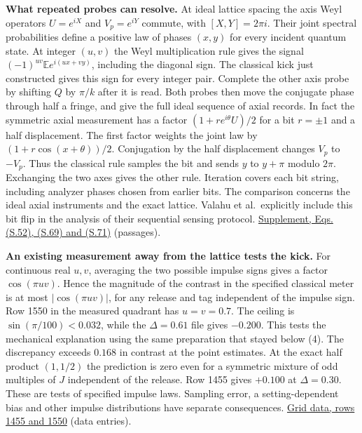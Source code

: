 \documentclass[11pt,a4paper]{article}
\begin{document}
\textbf{What repeated probes can resolve.} At ideal lattice spacing the
axis Weyl operators \(U=e^{iX}\) and \(V_p=e^{iY}\) commute, with
\([X,Y]=2\pi i\). Their joint spectral probabilities define a positive
law of phases \((x,y)\) for every incident quantum state. At integer
\((u,v)\) the Weyl multiplication rule gives the signal
\((-1)^{uv}\mathbb E e^{i(ux+vy)}\), including the diagonal sign. The
classical kick just constructed gives this sign for every integer pair.
Complete the other axis probe by shifting \(Q\) by \(\pi/k\) after it is
read. Both probes then move the conjugate phase through half a fringe,
and give the full ideal sequence of axial records. In fact the symmetric
axial measurement has a factor \((1+r e^{i\theta}U)/2\) for a bit
\(r=\pm1\) and a half displacement. The first factor weights the joint
law by \((1+r\cos(x+\theta))/2\). Conjugation by the half displacement
changes \(V_p\) to \(-V_p\). Thus the classical rule samples the bit and
sends \(y\) to \(y+\pi\) modulo \(2\pi\). Exchanging the two axes gives
the other rule. Iteration covers each bit string, including analyzer
phases chosen from earlier bits. The comparison concerns the ideal axial
instruments and the exact lattice. Valahu et al.~explicitly include this
bit flip in the analysis of their sequential sensing protocol.
\href{https://arxiv.org/pdf/2412.04865\#page=26}{Supplement, Eqs.
(S.52), (S.69) and (S.71)} (passages).

\textbf{An existing measurement away from the lattice tests the kick.}
For continuous real \(u,v\), averaging the two possible impulse signs
gives a factor \(\cos(\pi uv)\). Hence the magnitude of the contrast in
the specified classical meter is at most \(|\cos(\pi uv)|\), for any
release and tag independent of the impulse sign. Row 1550 in the
measured quadrant has \(u=v=0.7\). The ceiling is
\(\sin(\pi/100)<0.032\), while the \(\Delta=0.61\) file gives
\(-0.200\). This tests the mechanical explanation using the same
preparation that stayed below (4). The discrepancy exceeds \(0.168\) in
contrast at the point estimates. At the exact half product \((1,1/2)\)
the prediction is zero even for a symmetric mixture of odd multiples of
\(J\) independent of the release. Row 1455 gives \(+0.100\) at
\(\Delta=0.30\). These are tests of specified impulse laws. Sampling
error, a setting-dependent bias and other impulse distributions have
separate consequences. \href{https://zenodo.org/records/14512034}{Grid
data, rows 1455 and 1550} (data entries).
\end{document}

